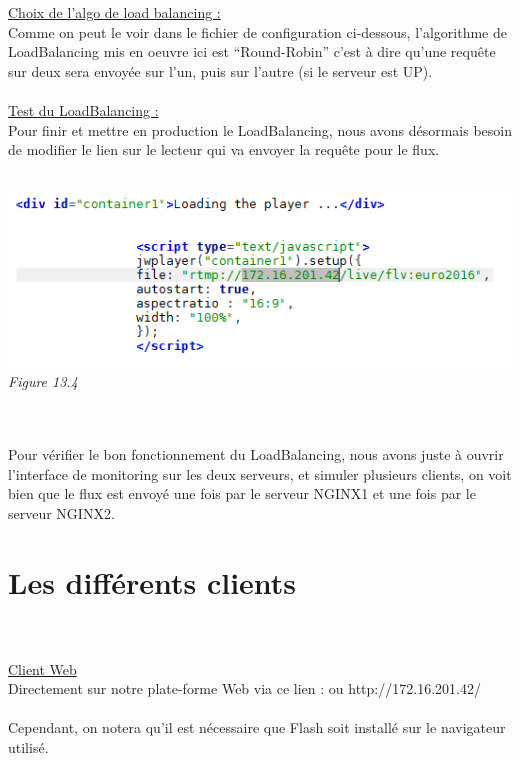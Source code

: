 \documentclass{report}
\begin{document}
    \underline{Choix de l’algo de load balancing :}\\
    
    Comme on peut le voir dans le fichier de configuration ci-dessous, l'algorithme de LoadBalancing mis en oeuvre ici est “Round-Robin” c’est à dire qu’une requête sur deux sera envoyée sur l’un, puis sur l’autre (si le serveur est UP).
    \\
    \\
    
    \underline{Test du LoadBalancing :}\\
    
    Pour finir et mettre en production le LoadBalancing, nous avons désormais besoin de modifier le lien sur le lecteur qui va envoyer la requête pour le flux.
    \\
    \\
    \begin{center}
    \includegraphics[width=16cm]{img/jw3.PNG}
    \textit{\small{Figure 13.4}}
    \end{center}
    

    \\
    \\
    Pour vérifier le bon fonctionnement du LoadBalancing, nous avons juste à ouvrir l’interface de monitoring sur les deux serveurs, et simuler plusieurs clients, on voit bien que le flux est envoyé une fois par le serveur NGINX1 et une fois par le serveur NGINX2.

    \newpage

    \section{Les différents clients}
    \\
    \\
    
    \underline{Client Web}\\
    
    Directement sur notre plate-forme Web via ce lien : ou http://172.16.201.42/
    \\
    \\
    Cependant, on notera qu’il est nécessaire que Flash soit installé sur le navigateur utilisé.
    \\
    \\
    
\end{document}
